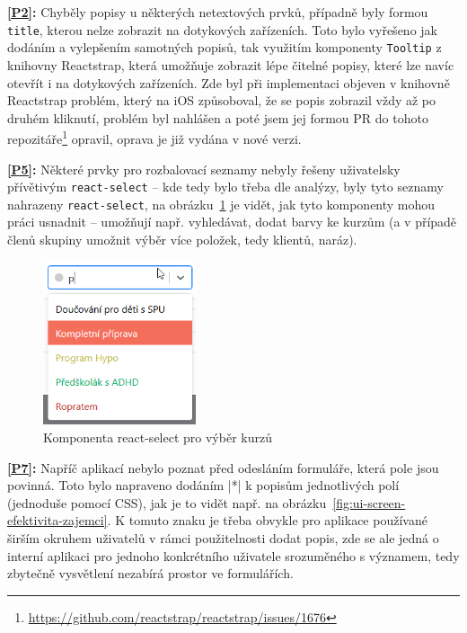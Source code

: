 \textbf{\ref{P2}:} Chyběly popisy u některých netextových prvků, případně byly formou \verb|title|, kterou nelze zobrazit na dotykových zařízeních. Toto bylo vyřešeno jak dodáním a vylepšením samotných popisů, tak využitím komponenty \verb|Tooltip| z knihovny Reactstrap, která umožňuje zobrazit lépe čitelné popisy, které lze navíc otevřít i na dotykových zařízeních. Zde byl při implementaci objeven v knihovně Reactstrap problém, který na iOS způsoboval, že se popis zobrazil vždy až po druhém kliknutí, problém byl nahlášen a poté jsem jej formou PR do tohoto repozitáře\footnote{\url{https://github.com/reactstrap/reactstrap/issues/1676}} opravil, oprava je již vydána v nové verzi.

\textbf{\ref{P5}:} Některé prvky pro rozbalovací seznamy nebyly řešeny uživatelsky přívětivým \verb|react-select| -- kde tedy bylo třeba dle analýzy, byly tyto seznamy nahrazeny \verb|react-select|, na obrázku~\ref{fig:ui-screen-select} je vidět, jak tyto komponenty mohou práci usnadnit -- umožňují např. vyhledávat, dodat barvy ke kurzům (a v případě členů skupiny umožnit výběr více položek, tedy klientů, naráz).

\begin{figure}[h]\centering
    \includegraphics[width=0.4\textwidth]{img/ui-screen-select.png}
    \caption{Komponenta react-select pro výběr kurzů}\label{fig:ui-screen-select}
\end{figure}

\textbf{\ref{P7}:} Napříč aplikací nebylo poznat před odesláním formuláře, která pole jsou povinná. Toto bylo napraveno dodáním \cverb|*| k popisům jednotlivých polí (jednoduše pomocí CSS), jak je to vidět např. na obrázku~\ref{fig:ui-screen-efektivita-zajemci}. K tomuto znaku je třeba obvykle pro aplikace používané širším okruhem uživatelů v rámci použitelnosti dodat popis, zde se ale jedná o interní aplikaci pro jednoho konkrétního uživatele srozuměného s významem, tedy zbytečně vysvětlení nezabírá prostor ve formulářích.

